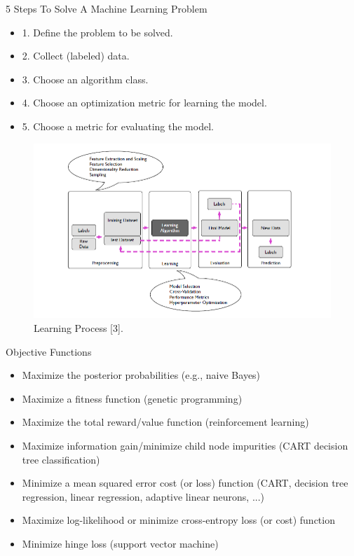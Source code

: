 \documentclass[compress,oilve]{beamer}
\begin{document}
\begin{frame}{5 Steps To Solve A Machine Learning Problem}
\begin{itemize}
\item 1. Define the problem to be solved.
\item 2. Collect (labeled) data.
\item 3. Choose an algorithm class.
\item 4. Choose an optimization metric for learning the model.
\item 5. Choose a metric for evaluating the model.
\end{itemize}
\begin{figure}
 \centering
 \includegraphics[scale=0.6]{13}  
 \caption{Learning Process [3].}
\end{figure}
\end{frame}

\begin{frame}{Objective Functions}
\begin{itemize}
\item Maximize the posterior probabilities (e.g., naive Bayes)
\item Maximize a fitness function (genetic programming)
\item Maximize the total reward/value function (reinforcement learning)
\item Maximize information gain/minimize child node impurities (CART decision tree classification)
\item Minimize a mean squared error cost (or loss) function (CART, decision tree regression, linear regression, adaptive linear neurons, ...)
\item Maximize log-likelihood or minimize cross-entropy loss (or cost) function
\item Minimize hinge loss (support vector machine)
\end{itemize}
\end{frame}
\end{document}
